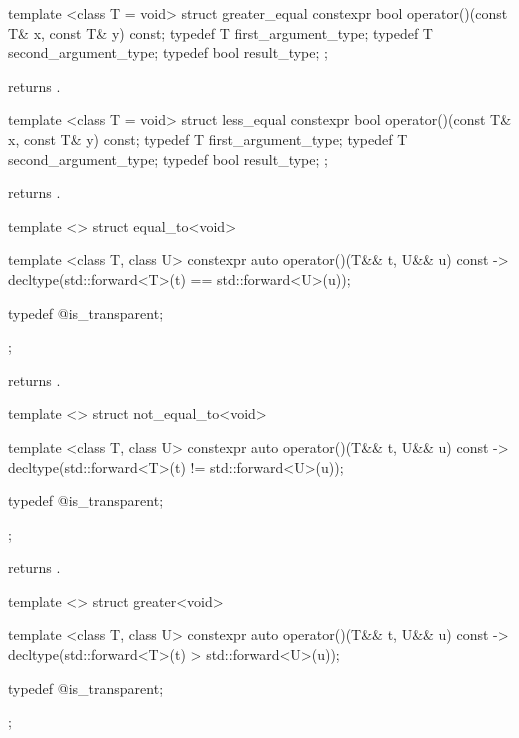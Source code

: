 %
\begin{itemdecl}
template <class T = void> struct greater_equal {
  constexpr bool operator()(const T& x, const T& y) const;
  typedef T first_argument_type;
  typedef T second_argument_type;
  typedef bool result_type;
};
\end{itemdecl}

\begin{itemdescr}
\pnum
{} returns .
\end{itemdescr}

%
\begin{itemdecl}
template <class T = void> struct less_equal {
  constexpr bool operator()(const T& x, const T& y) const;
  typedef T first_argument_type;
  typedef T second_argument_type;
  typedef bool result_type;
};
\end{itemdecl}

\begin{itemdescr}
\pnum
{} returns .
\end{itemdescr}

%
\begin{itemdecl}
template <> struct equal_to<void> {
  template <class T, class U> constexpr auto operator()(T&& t, U&& u) const
    -> decltype(std::forward<T>(t) == std::forward<U>(u));

  typedef @\unspec@ is_transparent;
};
\end{itemdecl}

\begin{itemdescr}
\pnum
{} returns .
\end{itemdescr}

%
\begin{itemdecl}
template <> struct not_equal_to<void> {
  template <class T, class U> constexpr auto operator()(T&& t, U&& u) const
    -> decltype(std::forward<T>(t) != std::forward<U>(u));

  typedef @\unspec@ is_transparent;
};
\end{itemdecl}

\begin{itemdescr}
\pnum
{} returns .
\end{itemdescr}

%
\begin{itemdecl}
template <> struct greater<void> {
  template <class T, class U> constexpr auto operator()(T&& t, U&& u) const
    -> decltype(std::forward<T>(t) > std::forward<U>(u));

  typedef @\unspec@ is_transparent;
};
\end{itemdecl}

